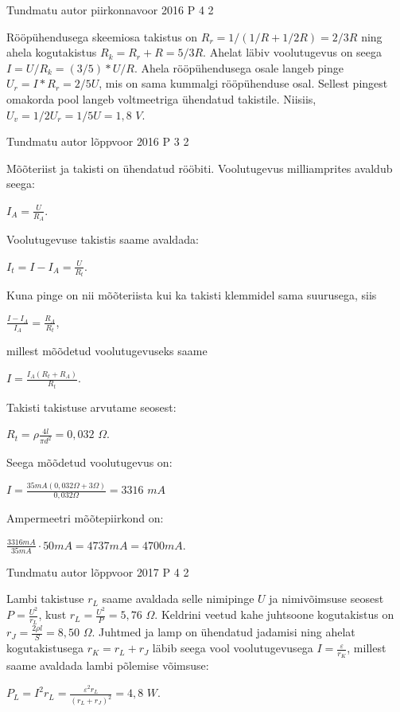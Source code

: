 \documentclass[11pt]{article}
\begin{document}
{%
{Tundmatu autor} %
{piirkonnavoor} %
{2016} %
{P 4} %
{2} %
{

\ifSolution
Rööpühendusega skeemiosa takistus on $R_r = 1/(1/R + 1/2R) = 2/3 R$ ning ahela kogutakistus $R_k = R_r + R = 5/3R$. Ahelat läbiv voolutugevus on seega $I = U/R_k = (3/5)*U/R$. Ahela rööpühendusega osale langeb pinge $U_r = I*R_r = 2/5 U$, mis on sama kummalgi rööpühenduse osal. Sellest pingest omakorda pool langeb voltmeetriga ühendatud takistile. Niisiis, $U_v = 1/2U_r = 1/5 U = 1,8$ $V$.
\fi
}


{Tundmatu autor} %
{lõppvoor} %
{2016} %
{P 3} %
{2} %
{

\ifSolution
Mõõteriist ja takisti on ühendatud rööbiti. Voolutugevus milliamprites avaldub seega:
\begin{center}
$I_A = \frac{U}{R_A}$.
\end{center}
Voolutugevuse takistis saame avaldada:
\begin{center}
$I_t = I - I_A = \frac{U}{R_t}$.
\end{center}
Kuna pinge on nii mõõteriista kui ka takisti klemmidel sama suurusega, siis
\begin{center}
$\frac{I - I_A}{I_A} = \frac{R_A}{R_t}$,
\end{center}
millest mõõdetud voolutugevuseks saame 
\begin{center}
$I = \frac{I_A (R_t + R_A)}{R_t}$.
\end{center}
Takisti takistuse arvutame seosest:
\begin{center}
$R_t = \rho \frac{4l}{\pi d^2} = 0,032$ $\Omega$.
\end{center}
Seega mõõdetud voolutugevus on:
\begin{center}
$I = \frac{35 mA(0,032 \Omega + 3 \Omega)}{0,032 \Omega} = 3316$ $mA$
\end{center}
Ampermeetri mõõtepiirkond on:
\begin{center}
$\frac{3316 mA}{35 mA} \cdot 50mA = 4737 mA = 4700 mA$.
\end{center}
\fi
}

{Tundmatu autor} %
{lõppvoor} %
{2017} %
{P 4} %
{2} %
{

\ifSolution
Lambi takistuse $r_L$ saame avaldada selle nimipinge $U$ ja nimivõimsuse seosest $P = \frac{U^2}{r_L}$, kust $r_L = \frac{U^2}{P} = 5,76$ $\Omega$. Keldrini veetud kahe juhtsoone kogutakistus on $r_J =\frac{ 2 \rho l}{S} = 8,50$ $\Omega$. Juhtmed ja lamp on ühendatud jadamisi ning ahelat kogutakistusega $r_K = r_L + r_J$ läbib seega vool voolutugevusega $I = \frac{\varepsilon}{r_K}$, millest saame avaldada lambi põlemise võimsuse:
\begin{center}
$P_L = I^2 r_L = \frac{\varepsilon ^2 r_L}{(r_L + r_J)^2} = 4,8$ $W$. 
\end{center}
\fi
}

}
\end{document}
